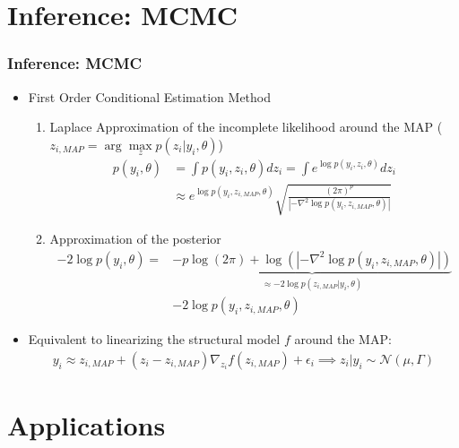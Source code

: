 \documentclass[xcolor={dvipsnames}]{beamer}
\begin{document}
\section{Inference: MCMC}

\begin{frame}
\frametitle{Inference: MCMC}

\begin{itemize}
\item First Order Conditional Estimation Method
  \begin{enumerate}
    \item Laplace Approximation of the incomplete likelihood around the MAP ($z_{i,MAP} = \arg \max \limits_{z} p(z_i|y_i,\theta)$)
    \begin{align}
    p(y_i,\theta) & = \int{p(y_i,z_i,\theta) dz_i} = \int{e^{\log p(y_i,z_i,\theta)} dz_i}\\
    & \approx e^{\log p(y_i,z_{i,MAP},\theta)} \sqrt{\frac{(2\pi)^p}{|-\nabla^2\log p(y_i,z_{i,MAP},\theta)|}}
    \end{align}
    \item Approximation of the posterior
    \begin{align}
    -2 \log p(y_i,\theta) = & \underbrace{-p \log(2\pi) +\log(|-\nabla^2\log p(y_i,z_{i,MAP},\theta)|)}_{\approx -2\log p(z_{i,MAP}|y_i,\theta)} \\
    & -2\log p(y_i,z_{i,MAP},\theta)
    \end{align}
  \end{enumerate} 
\item Equivalent to linearizing the structural model $f$ around the MAP:
\begin{align}
y_i \approx z_{i,MAP} + (z_i - z_{i,MAP})\nabla_{z_i} f(z_{i,MAP}) + \epsilon_i \implies z_i|y_i \sim \mathcal{N}(\mu, \Gamma)
\end{align}



\end{itemize}

\end{frame}




\section{Applications}
\end{document}
